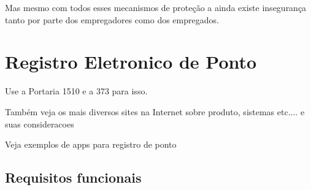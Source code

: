 \documentclass[12pt,openright,twoside,a4paper,english, brazil]{abntex2} %
\begin{document}
Mas mesmo com todos esses mecanismos de proteção a ainda existe insegurança tanto por parte dos empregadores como dos empregados.















\chapter{Registro Eletronico de Ponto}

Use a Portaria 1510 e a 373 para isso. 

Também veja os mais diversos sites na Internet sobre produto, sistemas etc.... e suas consideracoes

Veja exemplos de apps para registro de ponto

\section{Requisitos funcionais}
\end{document}
